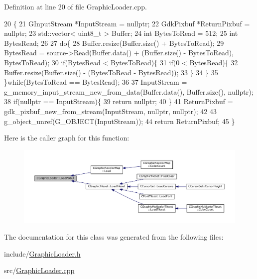 Definition at line 20 of file Graphic\+Loader.\+cpp.


\begin{DoxyCode}
20                                                                         \{
21     GInputStream *InputStream = \textcolor{keyword}{nullptr};
22     GdkPixbuf *ReturnPixbuf = \textcolor{keyword}{nullptr};
23     std::vector< uint8\_t > Buffer;
24     \textcolor{keywordtype}{int} BytesToRead = 512;
25     \textcolor{keywordtype}{int} BytesRead;
26     
27     \textcolor{keywordflow}{do}\{
28         Buffer.resize(Buffer.size() + BytesToRead);
29         BytesRead = source->Read(Buffer.data() + (Buffer.size() - BytesToRead), BytesToRead);
30         \textcolor{keywordflow}{if}(BytesRead < BytesToRead)\{
31             \textcolor{keywordflow}{if}(0 < BytesRead)\{
32                 Buffer.resize(Buffer.size() - (BytesToRead - BytesRead));
33             \}
34         \}
35     \}\textcolor{keywordflow}{while}(BytesToRead == BytesRead);
36     
37     InputStream = g\_memory\_input\_stream\_new\_from\_data(Buffer.data(), Buffer.size(), \textcolor{keyword}{nullptr});
38     \textcolor{keywordflow}{if}(\textcolor{keyword}{nullptr} == InputStream)\{
39         \textcolor{keywordflow}{return} \textcolor{keyword}{nullptr};   
40     \}
41     ReturnPixbuf = gdk\_pixbuf\_new\_from\_stream(InputStream, \textcolor{keyword}{nullptr}, \textcolor{keyword}{nullptr}); 
42     
43     g\_object\_unref(G\_OBJECT(InputStream));
44     \textcolor{keywordflow}{return} ReturnPixbuf;
45 \}
\end{DoxyCode}
Here is the caller graph for this function\+:
\nopagebreak
\begin{figure}[H]
\begin{center}
\leavevmode
\includegraphics[width=350pt]{classCGraphicLoader_ac7778dec4fd0ea51674f0b23f3029edf_icgraph}
\end{center}
\end{figure}


The documentation for this class was generated from the following files\+:\begin{DoxyCompactItemize}
\item 
include/\hyperlink{GraphicLoader_8h}{Graphic\+Loader.\+h}\item 
src/\hyperlink{GraphicLoader_8cpp}{Graphic\+Loader.\+cpp}\end{DoxyCompactItemize}
